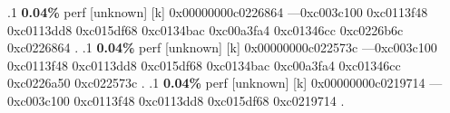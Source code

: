 \begin{profile}
{.1 \textbf{ 0.04\%} perf             [unknown]              [k] 0x00000000c0226864\newline {} ---0xc003c100\newline {} 0xc0113f48\newline {} 0xc0113dd8\newline {} 0xc015df68\newline {} 0xc0134bac\newline {} 0xc00a3fa4\newline {} 0xc01346cc\newline {} 0xc0226b6c\newline {} 0xc0226864\newline {} . 
.1 \textbf{ 0.04\%} perf             [unknown]              [k] 0x00000000c022573c\newline {} ---0xc003c100\newline {} 0xc0113f48\newline {} 0xc0113dd8\newline {} 0xc015df68\newline {} 0xc0134bac\newline {} 0xc00a3fa4\newline {} 0xc01346cc\newline {} 0xc0226a50\newline {} 0xc022573c\newline {} . 
.1 \textbf{ 0.04\%} perf             [unknown]              [k] 0x00000000c0219714\newline {} ---0xc003c100\newline {} 0xc0113f48\newline {} 0xc0113dd8\newline {} 0xc015df68\newline {} 0xc0219714\newline {} . 
}
\end{profile}
